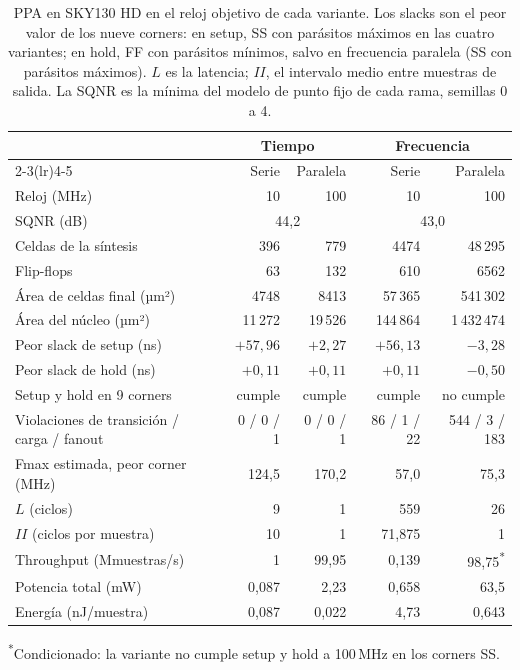 \begin{table}[h]
  \centering
  \caption{PPA en SKY130 HD en el reloj objetivo de cada variante. Los slacks son el peor valor de los nueve corners: en setup, SS con parásitos máximos en las cuatro variantes; en hold, FF con parásitos mínimos, salvo en frecuencia paralela (SS con parásitos máximos). $L$ es la latencia; $II$, el intervalo medio entre muestras de salida. La SQNR es la mínima del modelo de punto fijo de cada rama, semillas 0 a 4.}\label{tab:ppa}
  \small
  \begin{tabular}{lrrrr}
    \toprule
    & \multicolumn{2}{c}{Tiempo} & \multicolumn{2}{c}{Frecuencia} \\
    \cmidrule(lr){2-3}\cmidrule(lr){4-5}
    & Serie & Paralela & Serie & Paralela \\
    \midrule
    Reloj (MHz) & 10 & 100 & 10 & 100 \\
    SQNR (dB) & \multicolumn{2}{c}{44,2} & \multicolumn{2}{c}{43,0} \\
    Celdas de la síntesis & 396 & 779 & 4474 & 48\,295 \\
    Flip-flops & 63 & 132 & 610 & 6562 \\
    Área de celdas final (µm²) & 4748 & 8413 & 57\,365 & 541\,302 \\
    Área del núcleo (µm²) & 11\,272 & 19\,526 & 144\,864 & 1\,432\,474 \\
    Peor slack de setup (ns) & $+57{,}96$ & $+2{,}27$ & $+56{,}13$ & $-3{,}28$ \\
    Peor slack de hold (ns) & $+0{,}11$ & $+0{,}11$ & $+0{,}11$ & $-0{,}50$ \\
    Setup y hold en 9 corners & cumple & cumple & cumple & no cumple \\
    Violaciones de transición / carga / fanout & 0 / 0 / 1 & 0 / 0 / 1 & 86 / 1 / 22 & 544 / 3 / 183 \\
    Fmax estimada, peor corner (MHz) & 124,5 & 170,2 & 57,0 & 75,3 \\
    $L$ (ciclos) & 9 & 1 & 559 & 26 \\
    $II$ (ciclos por muestra) & 10 & 1 & 71,875 & 1 \\
    Throughput (Mmuestras/s) & 1 & 99,95 & 0,139 & 98,75\textsuperscript{*} \\
    Potencia total (mW) & 0,087 & 2,23 & 0,658 & 63,5 \\
    Energía (nJ/muestra) & 0,087 & 0,022 & 4,73 & 0,643 \\
    \bottomrule
  \end{tabular}

  \smallskip
  \footnotesize\textsuperscript{*}Condicionado: la variante no cumple setup y hold a 100\,MHz en los corners SS.
\end{table}

